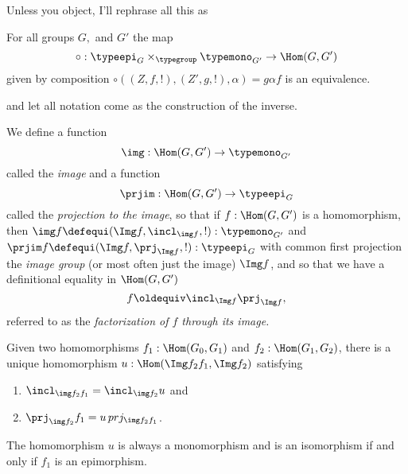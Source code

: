{\color{red}Unless you object, I'll rephrase all this as
  \begin{theorem}
    For all groups $G,$ and $G'$ the map
    $$\circ:\typeepi_G\times_{\typegroup}\typemono_{G'}\to\Hom(G,G')
    $$
    given by composition $\circ((Z,f,!),(Z',g,!),\alpha)=g\alpha f$ is an equivalence.
  \end{theorem}
  and let all notation come as the construction of the inverse.
  }
\begin{construction}\label{con:im}
  We define a function
  $$\img:\Hom(G,G')\to\typemono_{G'}$$
  called the \emph{image} %
  and a function
  $$\prjim:\Hom(G,G')\to\typeepi_G
  $$
  called the \emph{projection to the image},
  so that if  $f:\Hom(G,G')$  is a homomorphism, then
  $\img f\defequi(\Img f,\incl_{\img f},!):\typemono_{G'}$ and
  $\prjim f\defequi(\Img f,\prj_{\Img f},!):\typeepi_G$
  with common first projection the \emph{image group} (or most often just the image) $\Img f$, and so that we have a definitional equality in $\Hom(G,G')$
$$f\oldequiv\incl_{\Img f}\prj_{\Img f},$$
referred to as the \emph{factorization of $f$ through its image.}

Given two homomorphisms $f_1:\Hom(G_0,G_1)$ and $f_2:\Hom(G_1,G_2)$, there is a unique homomorphism
$u:\Hom(\Img f_2f_1,\Img f_2)$ satisfying
\begin{enumerate}
\item $\incl_{\img f_2f_1}=\incl_{\img f_2}u$ and
\item $\prj_{\img f_2}f_1=u\,prj_{\img f_2f_1}$.
\end{enumerate}
The homomorphism $u$ is always a monomorphism and is an isomorphism if and only if  $f_1$ is an epimorphism.


\end{construction}

